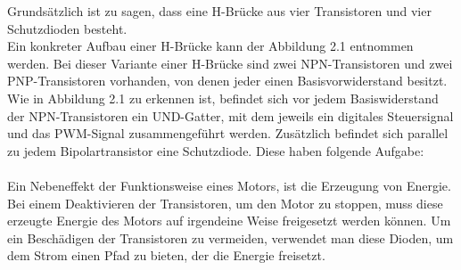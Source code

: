 Grundsätzlich ist zu sagen, dass eine H-Brücke aus vier Transistoren und vier Schutzdioden besteht. \\
Ein konkreter Aufbau einer H-Brücke kann der Abbildung 2.1 entnommen werden.
Bei dieser Variante einer H-Brücke sind zwei NPN-Transistoren und zwei PNP-Transistoren vorhanden, von denen jeder einen Basisvorwiderstand besitzt.
Wie in Abbildung 2.1 zu erkennen ist, befindet sich vor jedem Basiswiderstand der NPN-Transistoren ein UND-Gatter, mit dem jeweils ein digitales Steuersignal und das PWM-Signal zusammengeführt werden.
Zusätzlich befindet sich parallel zu jedem Bipolartransistor eine Schutzdiode.
Diese haben folgende Aufgabe:\\\\
Ein Nebeneffekt der Funktionsweise eines Motors, ist die Erzeugung von Energie.
Bei einem Deaktivieren der Transistoren, um den Motor zu stoppen, muss diese erzeugte Energie des Motors auf irgendeine Weise freigesetzt werden können.
Um ein Beschädigen der Transistoren zu vermeiden, verwendet man diese Dioden, um dem Strom einen Pfad zu bieten, der die Energie freisetzt. \\\\



